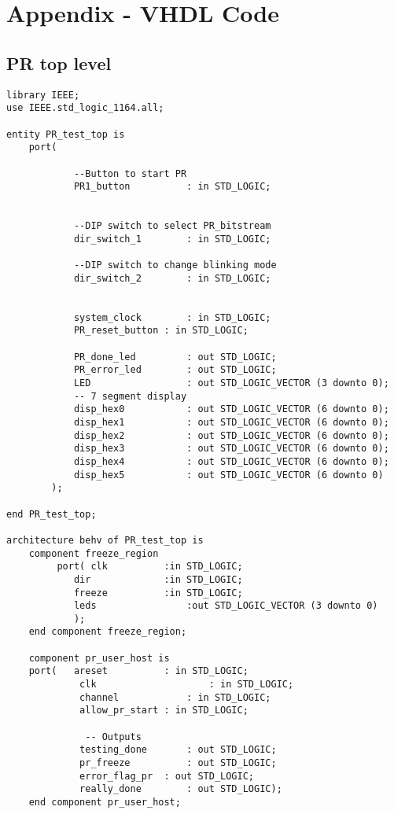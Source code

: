 \section{Appendix - VHDL Code}
\subsection{PR top level}
\begin{lstlisting}[style=vhdl]
library IEEE;
use IEEE.std_logic_1164.all; 

entity PR_test_top is
    port( 
     
            --Button to start PR
            PR1_button          : in STD_LOGIC;

            
            --DIP switch to select PR_bitstream
            dir_switch_1        : in STD_LOGIC;
            
            --DIP switch to change blinking mode 
            dir_switch_2        : in STD_LOGIC;
            
            
            system_clock        : in STD_LOGIC;
            PR_reset_button : in STD_LOGIC;
            
            PR_done_led         : out STD_LOGIC; 
            PR_error_led        : out STD_LOGIC;            
            LED                 : out STD_LOGIC_VECTOR (3 downto 0);
            -- 7 segment display
            disp_hex0           : out STD_LOGIC_VECTOR (6 downto 0);  
            disp_hex1           : out STD_LOGIC_VECTOR (6 downto 0);
            disp_hex2           : out STD_LOGIC_VECTOR (6 downto 0);
            disp_hex3           : out STD_LOGIC_VECTOR (6 downto 0);
            disp_hex4           : out STD_LOGIC_VECTOR (6 downto 0);
            disp_hex5           : out STD_LOGIC_VECTOR (6 downto 0)
        );
            
end PR_test_top;

architecture behv of PR_test_top is
    component freeze_region
         port( clk          :in STD_LOGIC;
            dir             :in STD_LOGIC;       
            freeze          :in STD_LOGIC;
            leds                :out STD_LOGIC_VECTOR (3 downto 0)
            );
    end component freeze_region;
     
    component pr_user_host is
    port(   areset          : in STD_LOGIC;
             clk                    : in STD_LOGIC;
             channel            : in STD_LOGIC;
             allow_pr_start : in STD_LOGIC;

              -- Outputs
             testing_done       : out STD_LOGIC; 
             pr_freeze          : out STD_LOGIC; 
             error_flag_pr  : out STD_LOGIC; 
             really_done        : out STD_LOGIC);
    end component pr_user_host;
    

\end{lstlisting}
